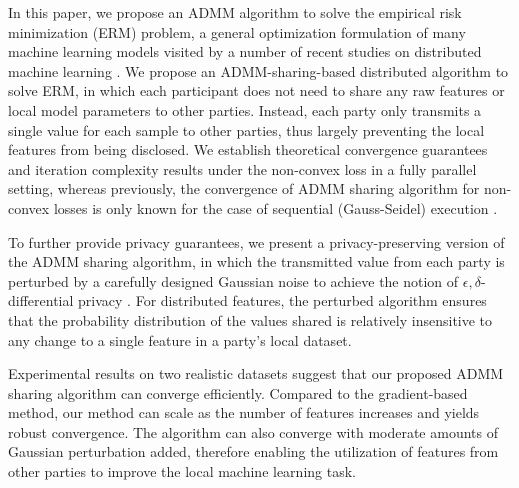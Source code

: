 In this paper, we propose an ADMM algorithm to solve the empirical risk minimization (ERM) problem, a general optimization formulation of many machine learning models visited by a number of recent studies on distributed machine learning  \cite{ying2018supervised, chaudhuri2011differentially}. We propose an ADMM-sharing-based distributed algorithm to solve ERM, in which each participant does not need to share any raw features or local model parameters to other parties. Instead, each party only transmits a single value for each sample to other parties, thus largely preventing the local features from being disclosed. We establish theoretical convergence guarantees and iteration complexity results under the non-convex loss in a fully parallel setting, whereas previously, the convergence of ADMM sharing algorithm for non-convex losses is only known for the case of sequential (Gauss-Seidel) execution \cite{hong2016convergence}.

To further provide privacy guarantees, we present a privacy-preserving version of the ADMM sharing algorithm, in which the transmitted value from each party is perturbed by a carefully designed Gaussian noise to achieve
the notion of $\epsilon,\delta$-differential privacy \cite{dwork2008differential, dwork2014algorithmic}. For distributed features, the perturbed algorithm ensures that the probability distribution of the values shared is relatively insensitive to any change to a single feature in a party's local dataset.

Experimental results on two realistic datasets suggest that our proposed ADMM sharing algorithm can converge efficiently. Compared to the gradient-based method, our method can scale as the number of features increases and yields robust convergence. The algorithm can also converge with moderate amounts of Gaussian perturbation added, therefore enabling the utilization of features from other parties to improve the local machine learning task.
